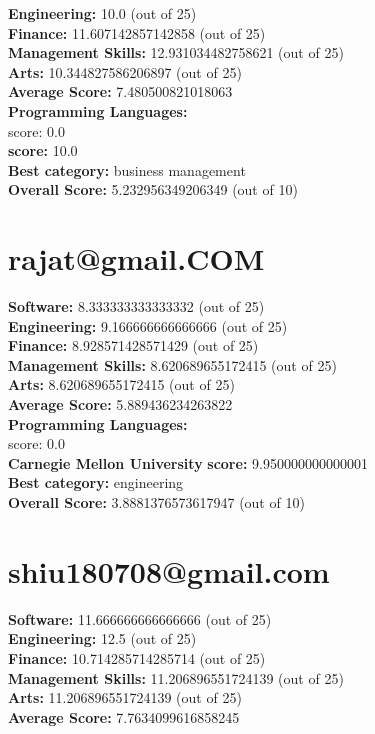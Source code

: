 \documentclass{article}
\begin{document}
\textbf{Engineering: } 10.0 (out of 25)\\
\textbf{Finance:} 11.607142857142858 (out of 25)\\
\textbf{Management Skills:} 12.931034482758621 (out of 25)\\
\textbf{Arts:} 10.344827586206897 (out of 25)\\
\textbf{Average Score: } 7.480500821018063\\
\textbf{Programming Languages:} \\
score: 0.0\\
 \textbf{score:} 10.0\\
\textbf{Best category: } business management\\
\textbf{Overall Score: }5.232956349206349 (out of 10)\section{rajat@gmail.COM}
\textbf{Software:} 8.333333333333332 (out of 25)\\
\textbf{Engineering: } 9.166666666666666 (out of 25)\\
\textbf{Finance:} 8.928571428571429 (out of 25)\\
\textbf{Management Skills:} 8.620689655172415 (out of 25)\\
\textbf{Arts:} 8.620689655172415 (out of 25)\\
\textbf{Average Score: } 5.889436234263822\\
\textbf{Programming Languages:} \\
score: 0.0\\
\textbf{Carnegie Mellon University} \textbf{score:} 9.950000000000001\\
\textbf{Best category: } engineering\\
\textbf{Overall Score: }3.8881376573617947 (out of 10)\section{shiu180708@gmail.com}
\textbf{Software:} 11.666666666666666 (out of 25)\\
\textbf{Engineering: } 12.5 (out of 25)\\
\textbf{Finance:} 10.714285714285714 (out of 25)\\
\textbf{Management Skills:} 11.206896551724139 (out of 25)\\
\textbf{Arts:} 11.206896551724139 (out of 25)\\
\textbf{Average Score: } 7.7634099616858245\\
\end{document}
